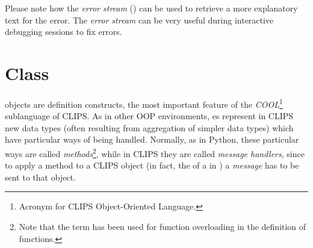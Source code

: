 Please note how the \emph{error stream} () can be used
to retrieve a more explanatory text for the error. The \emph{error
stream} can be very useful during interactive debugging \pyclips{}
sessions to fix errors.



\section{Class\label{pyclips-cl-Class}}

 objects are  definition constructs, the most
important feature of the \emph{COOL}\footnote{Acronym for CLIPS
Object-Oriented Language.} sublanguage of CLIPS. As in other OOP
environments, es represent in CLIPS new data types (often
resulting from aggregation of simpler data types) which have particular ways
of being handled. Normally, as in Python, these particular ways are called
\emph{methods}\footnote{Note that the term  has been used
for function overloading in the definition of 
functions.}, while in CLIPS they are called \emph{message handlers},
since to apply a method to a CLIPS object (in fact, the 
of a  in \pyclips{}) a \emph{message} has to be sent to that
object.

